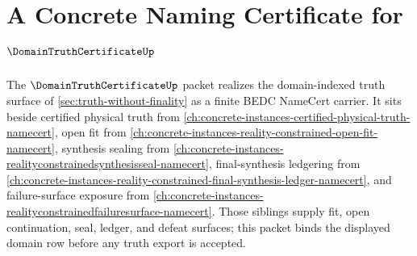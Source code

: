 \chapter{A Concrete Naming Certificate for $\DomainTruthCertificateUp$}
\label{ch:concrete-instances-domain-truth-certificate-namecert}

The $\DomainTruthCertificateUp$ packet realizes the domain-indexed truth surface of \autoref{sec:truth-without-finality} as a finite BEDC NameCert carrier. It sits beside certified physical truth from \autoref{ch:concrete-instances-certified-physical-truth-namecert}, open fit from \autoref{ch:concrete-instances-reality-constrained-open-fit-namecert}, synthesis sealing from \autoref{ch:concrete-instances-realityconstrainedsynthesisseal-namecert}, final-synthesis ledgering from \autoref{ch:concrete-instances-reality-constrained-final-synthesis-ledger-namecert}, and failure-surface exposure from \autoref{ch:concrete-instances-realityconstrainedfailuresurface-namecert}. Those siblings supply fit, open continuation, seal, ledger, and defeat surfaces; this packet binds the displayed domain row before any truth export is accepted.

